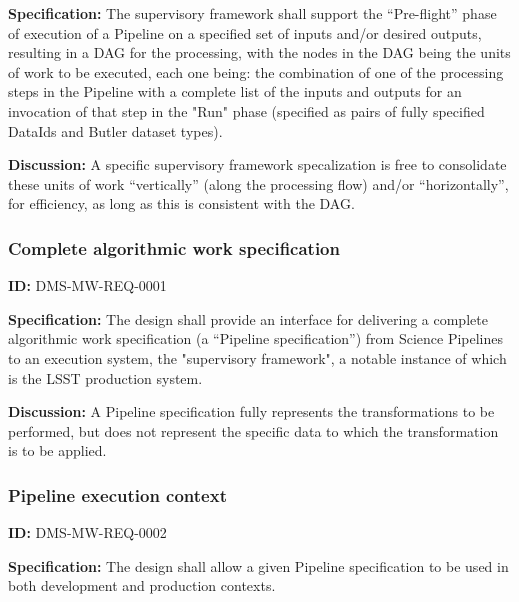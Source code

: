 \documentclass[SE,toc,lsstdraft]{lsstdoc}
\begin{document}
\textbf{Specification:}
The supervisory framework shall support the “Pre-flight” phase of execution of a Pipeline on a specified set of inputs and/or desired outputs, resulting in a DAG for the processing, with the nodes in the DAG being the units of work to be executed, each one being: the combination of one of the processing steps in the Pipeline with a complete list of the inputs and outputs for an invocation of that step in the "Run" phase (specified as pairs of fully specified DataIds and Butler dataset types).

\textbf{Discussion:}
A specific supervisory framework specalization is free to consolidate these units of work “vertically” (along the processing flow) and/or “horizontally”, for efficiency, as long as this is consistent with the DAG.

\subsubsection{Complete algorithmic work specification}

\label{DMS-MW-REQ-0001}
\textbf{ID:} DMS-MW-REQ-0001

\textbf{Specification:}
The design shall provide an interface for delivering a complete algorithmic work specification (a “Pipeline specification”) from Science Pipelines to an execution system, the "supervisory framework", a notable instance of which is the LSST production system.

\textbf{Discussion:}
A Pipeline specification fully represents the transformations to be performed, but does not represent the specific data to which the transformation is to be applied.

\subsubsection{Pipeline execution context}

\label{DMS-MW-REQ-0002}
\textbf{ID:} DMS-MW-REQ-0002

\textbf{Specification:}
The design shall allow a given Pipeline specification to be used in both development and production contexts.


\end{document}
